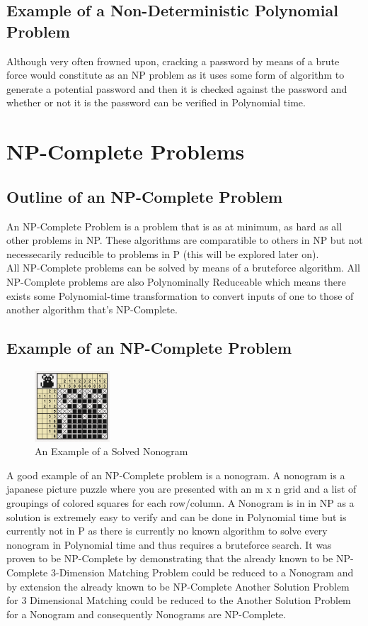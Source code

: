 \documentclass{article}
\begin{document}
	\subsection{Example of a Non-Deterministic Polynomial Problem}
	Although very often frowned upon, cracking a password by means of a brute force would constitute as an NP problem as it uses some form of algorithm to generate a potential password and then it is checked against the password and whether or not it is the password can be verified in Polynomial time.\citep{atkins-bittner_2014}
	\section{NP-Complete Problems}
		\subsection{Outline of an NP-Complete Problem}
			An NP-Complete Problem is a problem that is as at minimum, as hard as all other problems in NP. These algorithms are comparatible to others in NP but not necessecarily reducible to problems in P (this will be explored later on).\\
			All NP-Complete problems can be solved by means of a bruteforce algorithm. All NP-Complete problems are also Polynominally Reduceable which means there exists some Polynomial-time transformation to convert inputs of one to those of another algorithm that's NP-Complete.
		\subsection{Example of an NP-Complete Problem}
			\begin{figure}[H]
				\centering
				\includegraphics[width=0.25\textwidth]{MOUSE.PNG}
				\caption{An Example of a Solved Nonogram\citep{10x10mouse_2016}}
				\end{figure}
				A good example of an NP-Complete problem is a nonogram. A nonogram is a japanese picture puzzle where you are presented with an m x n grid and a list of groupings of colored squares for each row/column. A Nonogram is in in NP as a solution is extremely easy to verify and can be done in Polynomial time but is currently not in P as there is currently no known algorithm to solve every nonogram in Polynomial time and thus requires a bruteforce search. It was proven to be NP-Complete by demonstrating that the already known to be NP-Complete 3-Dimension Matching Problem \citep{karp1972reducibility} could be reduced to a Nonogram and by extension the already known to be NP-Complete Another Solution Problem for 3 Dimensional Matching could be reduced to the Another Solution Problem for a Nonogram and consequently Nonograms are NP-Complete.\citep{ueda1996np}\\
\end{document}
